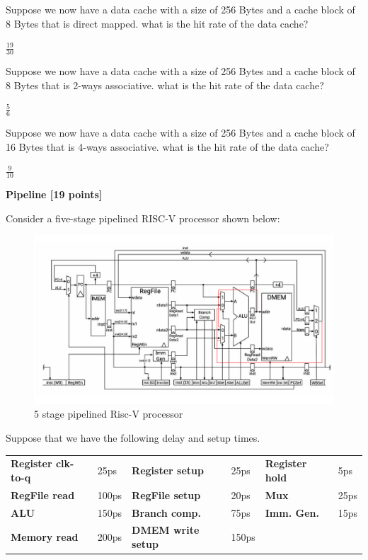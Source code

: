 \documentclass[addpoints, 12pt, answers]{exam}
\begin{document}
\begin{questions}
\begin{parts}
        Suppose we now have a data cache with a size of 256 Bytes and a cache block of 8 Bytes that is direct mapped. what is the hit rate of the data cache?


        \underline{$\frac{19}{30}$}

        Suppose we now have a data cache with a size of 256 Bytes and a cache block of 8 Bytes that is 2-ways associative. what is the hit rate of the data cache?


        \underline{$\frac{5}{6}$}


        Suppose we now have a data cache with a size of 256 Bytes and a cache block of 16 Bytes that is 4-ways associative. what is the hit rate of the data cache?

        \underline{$\frac{9}{10}$}




    \end{parts}

    \pagebreak


    \question \textbf{Pipeline [19 points]}

    Consider a five-stage pipelined RISC-V processor shown below:
    \begin{figure}[h]
        \centering
        \includegraphics[width=\linewidth]{pipeline.pdf}
        \caption*{5 stage pipelined Risc-V processor}
        \label{fig:pipelined}
    \end{figure}

    Suppose that we have the following delay and setup times.

    \begin{table}[h]
        \centering
        \begin{tabular}{l l l l l l}
            {\bf Register clk-to-q} & 25ps  & {\bf Register setup}   & 25ps  & {\bf Register hold} & 5ps  \\
            {\bf RegFile read}      & 100ps & {\bf RegFile setup}    & 20ps  & {\bf Mux}           & 25ps \\
            {\bf ALU}               & 150ps & {\bf Branch comp.}     & 75ps  & {\bf Imm. Gen.}     & 15ps \\
            {\bf Memory read}       & 200ps & {\bf DMEM write setup} & 150ps                              \\
        \end{tabular}
        \label{tab:delay_time}
    \end{table}


\end{questions}
\end{document}
